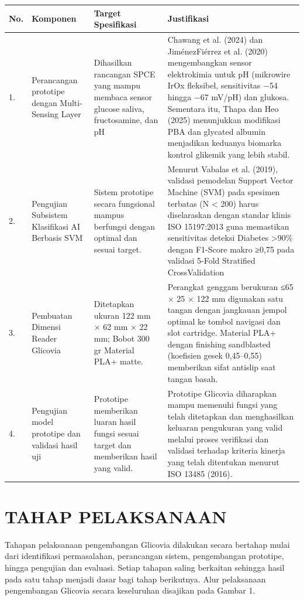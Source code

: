 \documentclass[a4paper,12pt]{article}
\begin{document}
\begin{longtable}{|p{}|p{}|p{}|p{}|}
\hline
No. & Komponen & Target Spesifikasi & Justifikasi \\
\hline
1. & Perancangan prototipe dengan Multi- Sensing Layer & Dihasilkan rancangan SPCE yang mampu membaca sensor glucose saliva, fructosamine, dan pH & Chawang et al. (2024) dan JiménezFiérrez et al. (2020) mengembangkan sensor elektrokimia untuk pH (mikrowire IrOx fleksibel, sensitivitas −54 hingga −67 mV/pH) dan glukosa. Sementara itu, Thapa dan Heo (2025) menunjukkan modifikasi PBA dan glycated albumin menjadikan keduanya biomarka kontrol glikemik yang lebih stabil. \\
\hline
2. & Pengujian Subsistem Klasifikasi AI Berbasis SVM & Sistem prototipe secara fungsional mampus berfungsi dengan optimal dan sesuai target. & Menurut Vabalas et al. (2019), validasi pemodelan Support Vector Machine (SVM) pada spesimen terbatas (N < 200) harus diselaraskan dengan standar klinis ISO 15197:2013 guna memastikan sensitivitas deteksi Diabetes >90\% dengan F1-Score makro ≥0,75 pada validasi 5-Fold Stratified CrossValidation \\
\hline
3. & Pembuatan Dimensi Reader Glicovia & Ditetapkan ukuran 122 mm × 62 mm × 22 mm; Bobot 300 gr Material PLA+ matte. & Perangkat genggam berukuran ≤65 × 25 × 122 mm digunakan satu tangan dengan jangkauan jempol optimal ke tombol navigasi dan slot cartridge. Material PLA+ dengan finishing sandblasted (koefisien gesek 0,45–0,55) memberikan sifat antislip saat tangan basah. \\
\hline
4. & Pengujian model prototipe dan validasi hasil uji & Prototipe memberikan luaran hasil fungsi sesuai target dan memberikan hasil yang valid. & Prototipe Glicovia diharapkan mampu memenuhi fungsi yang telah ditetapkan dan menghasilkan keluaran pengukuran yang valid melalui proses verifikasi dan validasi terhadap kriteria kinerja yang telah ditentukan menurut ISO 13485 (2016). \\
\hline
\end{longtable}

\section{TAHAP PELAKSANAAN}

Tahapan pelaksanaan pengembangan Glicovia dilakukan secara bertahap mulai dari identifikasi permasalahan, perancangan sistem, pengembangan prototipe, hingga pengujian dan evaluasi. Setiap tahapan saling berkaitan sehingga hasil pada satu tahap menjadi dasar bagi tahap berikutnya. Alur pelaksanaan pengembangan Glicovia secara keseluruhan disajikan pada Gambar 1.
\end{document}
